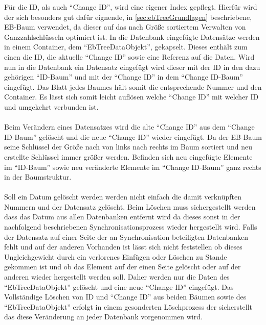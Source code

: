 \documentclass[a4paper,11pt,oneside,%
headsepline,												%
footsepline,												%
bibtotocnumbered									%
]{scrreprt}
\begin{document}
Für die \ac{ID}, als auch \enquote{Change ID}, wird eine eigener Index gepflegt. Hierfür wird der sich besonders gut dafür eignende, in \autoref{sec:ebTreeGrundlagen} beschriebene, \ac{EB-Baum} verwendet, da dieser auf das nach Größe sortiertem Verwalten von Ganzzahlschlüsseln optimiert ist. In die Datenbank eingefügte Datensätze werden in einem Container, dem \enquote{EbTreeDataObjekt}, gekapselt. Dieses enthält zum einen die \ac{ID}, die aktuelle \enquote{Change ID} sowie eine Referenz auf die Daten. Wird nun in die Datenbank ein Datensatz eingefügt wird dieser mit der \ac{ID} in den dazu gehörigen \enquote{ID-Baum} und mit der \enquote{Change ID} in dem \enquote{Change ID-Baum} eingefügt. Das Blatt jedes Baumes hält somit die entsprechende Nummer und den Container. Es lässt sich somit leicht auflösen welche \enquote{Change ID} mit welcher \ac{ID} und umgekehrt verbunden ist. \\\\
Beim Verändern eines Datensatzes wird die alte \enquote{Change ID} aus dem \enquote{Change ID-Baum} gelöscht und die neue \enquote{Change ID} wieder eingefügt. Da der \ac{EB-Baum} seine Schlüssel der Größe nach von links nach rechts im Baum sortiert und neu erstellte Schlüssel immer größer werden. Befinden sich neu eingefügte Elemente im \enquote{ID-Baum} sowie neu veränderte Elemente im \enquote{Change ID-Baum} ganz rechts in der Baumstruktur.\\\\
Soll ein Datum gelöscht werden werden nicht einfach die damit verknüpften Nummern und der Datensatz gelöscht. Beim Löschen muss sichergestellt werden dass das Datum aus allen Datenbanken entfernt wird da dieses sonst in der nachfolgend beschriebenen Synchronisationsprozess wieder hergestellt wird. Falls der Datensatz auf einer Seite der an Synchronisation beteiligten Datenbanken fehlt und auf der anderen Vorhanden ist lässt sich nicht feststellen ob dieses Ungleichgewicht durch ein verlorenes Einfügen oder Löschen zu Stande gekommen ist und ob das Element auf der einen Seite gelöscht oder auf der anderen wieder hergestellt werden soll. Daher werden nur die Daten des \enquote{EbTreeDataObjekt} gelöscht und eine neue \enquote{Change ID} eingefügt. Das Vollständige Löschen von \ac{ID} und \enquote{Change ID} aus beiden Bäumen sowie des \enquote{EbTreeDataObjekt} erfolgt in einem gesonderten Löschprozess der sicherstellt das diese Veränderung an jeder Datenbank vorgenommen wird.
\end{document}
